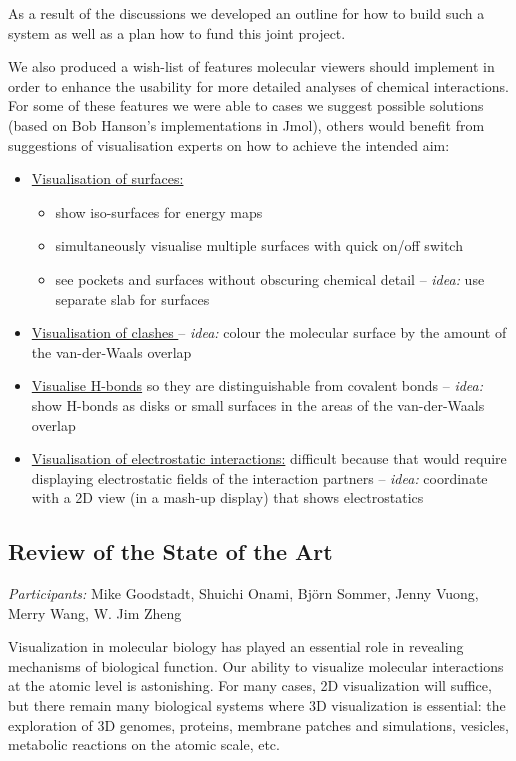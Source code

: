 \documentclass[a4paper]{article}
\begin{document}
As a result of the discussions we developed an outline for how to build such a system as well as a plan how to fund this joint project. 

We also produced a wish-list of features molecular viewers should implement in order to enhance the usability for more detailed analyses of chemical interactions. For some of these features we were able to cases we suggest possible solutions (based on Bob Hanson's implementations in Jmol), others would benefit from suggestions of visualisation experts on how to achieve the intended aim: 
\begin{itemize}
\item \underline{Visualisation of surfaces:}
	\begin{itemize}
	\item  show iso-surfaces for energy maps
	\item  simultaneously visualise multiple surfaces with quick on/off switch 
	\item  see pockets and surfaces without obscuring chemical detail -- \emph{idea:} use separate slab for surfaces 
	\end{itemize}
\item  \underline{Visualisation of clashes }--  \emph{idea:} colour the molecular surface by the amount of the van-der-Waals overlap
\item  \underline{Visualise H-bonds} so they are distinguishable from covalent bonds -- \emph{idea:} show H-bonds as disks or small surfaces in the areas of the van-der-Waals overlap
\item  \underline{Visualisation of electrostatic interactions:} difficult because that would require displaying electrostatic fields of the interaction partners -- \emph{idea:} coordinate with a 2D view (in a mash-up display) that shows electrostatics
\end{itemize}

\subsection{Review of the State of the Art}

\emph{Participants:} 
Mike Goodstadt, Shuichi Onami, Bj\"{o}rn Sommer, Jenny Vuong, Merry Wang, W. Jim Zheng
\medskip

Visualization in molecular biology has played an essential role in revealing mechanisms of biological function. Our ability to visualize molecular interactions at the atomic level is astonishing. For many cases, 2D visualization will suffice, but there remain many biological systems where 3D visualization is essential: the exploration of 3D genomes, proteins, membrane patches and simulations, vesicles, metabolic reactions on the atomic scale, etc.
\end{document}

